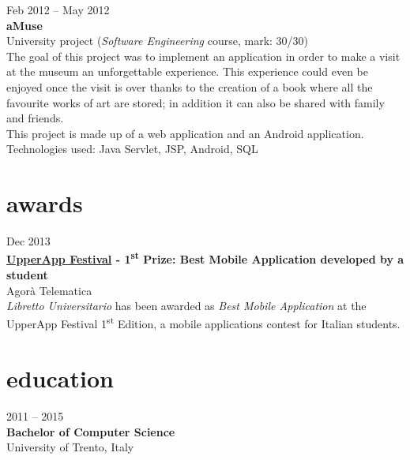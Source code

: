 \documentclass[]{friggeri-cv} %
\begin{document}
{Feb 2012 -- May 2012} \\
{\textbf{aMuse}} \\
{University project (\textit{Software Engineering} course, mark: 30/30)} \\
{The goal of this project was to implement an application in order to make a visit at the museum an unforgettable experience. This experience could even be enjoyed once the visit is over thanks to the creation of a book where all the favourite works of art are stored; in addition it can also be shared with family and friends.} \\
{This project is made up of a web application and an Android application.} \\
{Technologies used: Java Servlet, JSP, Android, SQL}


\section{awards}

{Dec 2013} \\
{\textbf{\href{http://www.upperapp.it}{UpperApp Festival} - 1\textsuperscript{st} Prize: Best Mobile Application developed by a student} \\
{Agorà Telematica} \\
\emph{Libretto Universitario} has been awarded as \textit{Best Mobile Application} at the UpperApp Festival 1\textsuperscript{st} Edition, a mobile applications contest for Italian students.}


\section{education}


{2011 -- 2015} \\
\textbf{{Bachelor {\normalfont of Computer Science}}} \\
{University of Trento, Italy}
\end{document}
